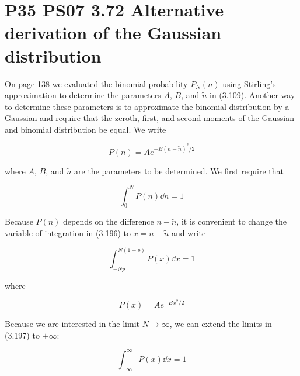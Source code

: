 \documentclass[9pt,a4paper,twocolumn]{article}
\begin{document}
\section{P35 PS07 3.72 Alternative derivation of the Gaussian distribution}
On page 138 we evaluated the binomial probability $P_N(n)$ using Stirling’s approximation to determine the parameters $A$, $B$, and $\tilde{n}$ in (3.109). Another way to determine these parameters is to
approximate the binomial distribution by a Gaussian and require that the zeroth, first, and second moments of the Gaussian and binomial distribution be equal. We write

\begin{equation}
	P(n) = Ae^{-B(n - \tilde{n})^2/2}
\end{equation}

where $A$, $B$, and $\tilde{n}$ are the parameters to be determined. We first require that

\begin{equation}
	\int_0^N P(n) \dd{n} = 1
\end{equation}

Because $P(n)$ depends on the difference $n-\tilde{n}$, it is convenient to change the variable of integration in (3.196) to $x = n - \tilde{n}$ and write

\begin{equation}
	\int_{-Np}^{N(1-p)} P(x)\dd{x} = 1
\end{equation}

where

\begin{equation}
	P(x) = Ae^{-Bx^2/2} \label{eq:3.72-changevar}
\end{equation}

Because we are interested in the limit $N \rightarrow \infty$, we can extend the limits in (3.197) to $\pm \infty$:

\begin{equation}
	\int_{-\infty}^{\infty} P(x)\dd{x} = 1 \label{eq:3.72-normcondition}
\end{equation}
\end{document}
